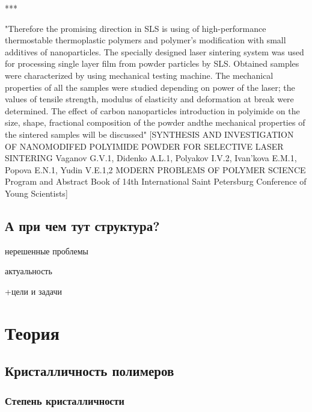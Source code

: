 \documentclass[oneside,final,14pt]{extreport}
\begin{document}
	
	***
	
	"Therefore the promising direction in SLS is using of high-performance thermostable
thermoplastic polymers and polymer’s modification with small additives of nanoparticles.
The specially designed laser sintering system was used for processing single layer film from powder particles by SLS. Obtained
samples were characterized by using mechanical testing machine.
The mechanical properties of all the samples were studied depending on power of the laser; the values of tensile strength, modulus of
elasticity and deformation at break were determined. The effect of carbon nanoparticles introduction in polyimide on the size, shape,
fractional composition of the powder andthe mechanical properties of the sintered samples will be discussed"
[SYNTHESIS AND INVESTIGATION OF NANOMODIFED POLYIMIDE POWDER FOR
SELECTIVE LASER SINTERING
Vaganov G.V.1, Didenko A.L.1, Polyakov I.V.2, Ivan’kova E.M.1, Popova E.N.1, Yudin V.E.1,2 MODERN PROBLEMS
OF POLYMER SCIENCE
Program and Abstract Book
of 14th International Saint Petersburg Conference
of Young Scientists]	

\section{А при чем тут структура?}
нерешенные проблемы

актуальность

+цели и задачи


	
	
	\chapter{Теория}
	
	\section{Кристалличность полимеров}


\subsection{Степень кристалличности}
	
\end{document}
